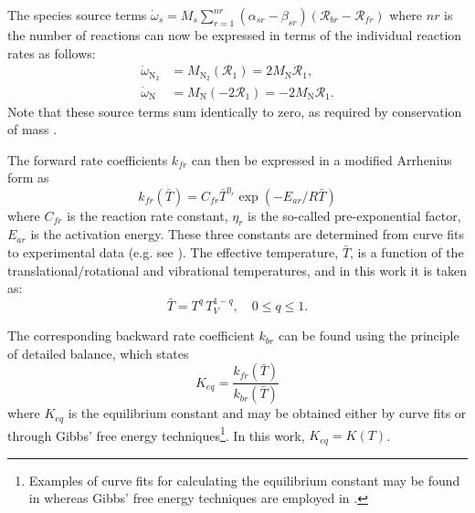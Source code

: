 \documentclass[10pt]{article}
\begin{document}
The species source terms $\dot{\omega}_s = M_s \sum_{r=1}^{nr}\left(\alpha_{sr}-\beta_{sr}\right)\left(\mathcal{R}_{br} - \mathcal{R}_{fr}\right)$ 
 where $nr$ is the number of reactions can now be expressed in terms of the individual reaction rates as follows:
\begin{align*}
 \dot{\omega}_{\text{N}_2} &= M_{\text{N}_2}\left(\mathcal{R}_1\right)= 2 M_\text{N} \mathcal{R}_1 ,\\
 \dot{\omega}_{\text{N}} &= M_{\text{N}}\left(-2\mathcal{R}_1 \right)=-2 M_\text{N} \mathcal{R}_1. 
\end{align*}
Note that these source terms sum identically to zero, as required by conservation of mass \citep{Kessler2004}.



The forward rate coefficients  $k_{fr}$  can then be expressed in a modified Arrhenius form as
\begin{equation}\label{eq:equilibrium_constant}
  k_{fr}\left(\bar{T}\right) = C_{fr} \bar{T}^{\eta_r} \exp \left(-E_{ar}/R\bar{T}\right)
\end{equation}
where $C_{fr}$ is the reaction rate constant, $\eta_r$ is the so-called pre-exponential factor, $E_{ar}$ is the activation energy.  These three constants are determined from curve fits to experimental data (e.g. see \cite{Ait1996}). The effective temperature, $\bar{T}$, is a function of the translational/rotational and vibrational temperatures, and in this work it is taken as:
\begin{equation}
	\label{eq:Tbar}
\bar{T}=T^{q} \, T_V^{1-q}, \quad 0\leq q\leq 1 .
\end{equation}


The corresponding backward rate coefficient   $k_{br}$  can be found using the principle of detailed balance, which states
\begin{equation}
  K_{eq} = \frac{k_{fr}\left(\bar{T}\right)}{k_{br}\left(\bar{T}\right)}
\end{equation}
where $K_{eq}$ is the equilibrium constant and may be obtained either by curve fits or through Gibbs' free energy techniques\footnote{Examples of curve fits for calculating the equilibrium constant may be found in \citet{Park1990} whereas Gibbs' free energy techniques are employed in \citet{Nasa_chemistry}. }. 
In this work, $K_{eq}=K(T)$.
\end{document}
